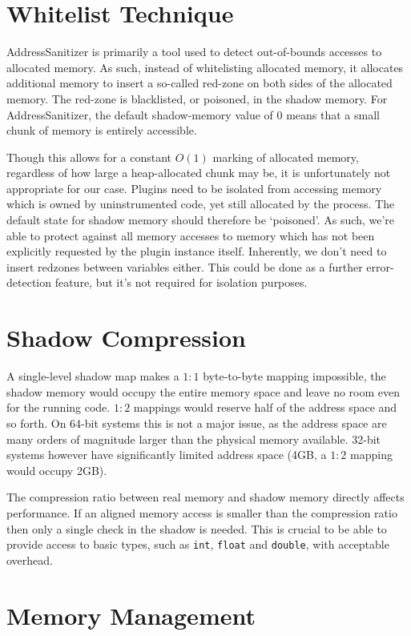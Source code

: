 \section {Whitelist Technique}

AddressSanitizer is primarily a tool used to detect out-of-bounds accesses to
allocated memory.
As such, instead of whitelisting allocated memory, it allocates additional
memory to insert a so-called red-zone on both sides of the allocated memory.
The red-zone is blacklisted, or poisoned, in the shadow memory.
For AddressSanitizer, the default shadow-memory value of $0$ means that a small
chunk of memory is entirely accessible.

Though this allows for a constant $O(1)$ marking of allocated memory, regardless
of how large a heap-allocated chunk may be, it is unfortunately not appropriate
for our case.
Plugins need to be isolated from accessing memory which is owned by
uninstrumented code, yet still allocated by the process.
The default state for shadow memory should therefore be `poisoned'.
As such, we're able to protect against all memory accesses to memory which has
not been explicitly requested by the plugin instance itself.
Inherently, we don't need to insert redzones between variables either.
This could be done as a further error-detection feature, but it's not required
for isolation purposes.


\section {Shadow Compression}

A single-level shadow map makes a $1:1$ byte-to-byte mapping impossible, the
shadow memory would occupy the entire memory space and leave no room even for
the running code.
$1:2$ mappings would reserve half of the address space and so forth.
On 64-bit systems this is not a major issue, as the address space are many
orders of magnitude larger than the physical memory available.
32-bit systems however have significantly limited address space (4GB, a $1:2$
mapping would occupy 2GB).

The compression ratio between real memory and shadow memory directly affects
performance.
If an aligned memory access is smaller than the compression ratio then only a
single check in the shadow is needed.
This is crucial to be able to provide access to basic types, such as
\texttt{int}, \texttt{float} and \texttt{double}, with acceptable overhead.


\section {Memory Management}

